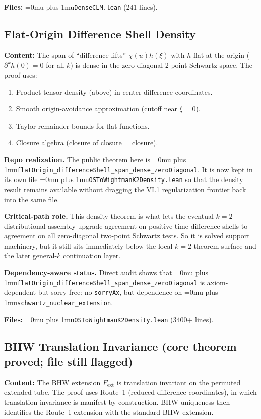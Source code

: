 \documentclass[11pt,a4paper]{article}
\newcommand{\leanfile}[1]{\begingroup\Urlmuskip=0mu plus 1mu\relax\nolinkurl{#1}\endgroup}
\newcommand{\leanname}[1]{\begingroup\Urlmuskip=0mu plus 1mu\relax\nolinkurl{#1}\endgroup}
\begin{document}
\textbf{Files:} \leanname{DenseCLM.lean} (241 lines).

\subsection{Flat-Origin Difference Shell Density}

\textbf{Content:} The span of ``difference lifts'' $\chi(u) h(\xi)$
with $h$ flat at the origin ($\partial^k h(0) = 0$ for all $k$) is
dense in the zero-diagonal 2-point Schwartz space. The proof uses:
\begin{enumerate}
\item Product tensor density (above) in center-difference coordinates.
\item Smooth origin-avoidance approximation (cutoff near $\xi = 0$).
\item Taylor remainder bounds for flat functions.
\item Closure algebra (closure of closure = closure).
\end{enumerate}

\medskip\noindent
\textbf{Repo realization.}
The public theorem here is
\leanname{flatOrigin\_differenceShell\_span\_dense\_zeroDiagonal}. It is now kept
in its own file \leanfile{OSToWightmanK2Density.lean} so that the density result
remains available without dragging the VI.1 regularization frontier back into the
same file.

\medskip\noindent
\textbf{Critical-path role.}
This density theorem is what lets the eventual $k=2$ distributional assembly
upgrade agreement on positive-time difference shells to agreement on all
zero-diagonal two-point Schwartz tests. So it is solved support machinery, but it
still sits immediately below the local $k=2$ theorem surface and the later
general-$k$ continuation layer.

\medskip\noindent
\textbf{Dependency-aware status.}
Direct audit shows that
\leanname{flatOrigin\_differenceShell\_span\_dense\_zeroDiagonal} is
axiom-dependent but sorry-free: no \texttt{sorryAx}, but dependence on
\leanname{schwartz\_nuclear\_extension}.

\textbf{Files:} \leanname{OSToWightmanK2Density.lean} (3400+ lines).

\subsection{BHW Translation Invariance (core theorem proved; file still flagged)}

\textbf{Content:} The BHW extension $F_{\mathrm{ext}}$ is translation
invariant on the permuted extended tube. The proof uses Route~1
(reduced difference coordinates), in which translation invariance is
manifest by construction. BHW uniqueness then identifies the Route~1
extension with the standard BHW extension.
\end{document}
